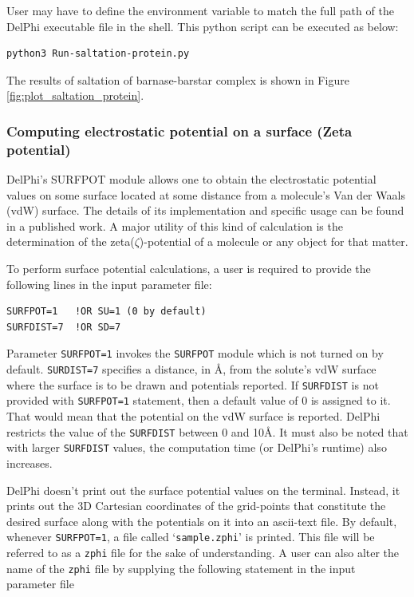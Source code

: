 \documentclass[9pt,tutorial,pubversion]{livecoms}
\newcommand*\ttvar[1]{\texttt{\expandafter\dottvar\detokenize{#1}\relax}}
\newcommand*\dottvar[1]{\ifx\relax#1\else
  \expandafter\ifx\string_#1\string_\allowbreak\else#1\fi
  \expandafter\dottvar\fi}
\begin{document}
User may have to define the environment variable \ttvar{$DELPHI_EXE} to match the full path of the DelPhi executable file in the shell. This python script can be executed as below:

\begin{verbatim}
python3 Run-saltation-protein.py
\end{verbatim}

The results of saltation of barnase-barstar complex is shown in Figure \ref{fig:plot_saltation_protein}.

\subsubsection{Computing electrostatic potential on a surface (Zeta potential)} 
DelPhi’s SURFPOT module allows one to obtain the electrostatic potential values on some surface located at some distance from a molecule’s Van der Waals (vdW) surface. The details of its implementation and specific usage can be found in a published work\cite{chakravorty2017new}. A major utility of this kind of calculation is the determination of the zeta($\zeta$)-potential of a molecule or any object for that matter. 

To perform surface potential calculations, a user is required to provide the following lines in the input parameter file:

\begin{verbatim}
SURFPOT=1   !OR SU=1 (0 by default)
SURFDIST=7  !OR SD=7
\end{verbatim}

Parameter \texttt{SURFPOT=1} invokes the \texttt{SURFPOT} module which is not turned on by default. \texttt{SURDIST=7} specifies a distance, in Å, from the solute’s vdW surface where the surface is to be drawn and potentials reported. If \texttt{SURFDIST} is not provided with \texttt{SURFPOT=1} statement, then a default value of 0 is assigned to it. That would mean that the potential on the vdW surface is reported. DelPhi restricts the value of the \texttt{SURFDIST} between 0 and 10Å. It must also be noted that with larger \texttt{SURFDIST} values, the computation time (or DelPhi’s runtime) also increases. 

DelPhi doesn’t print out the surface potential values on the terminal. Instead, it prints out the 3D Cartesian coordinates of the grid-points that constitute the desired surface along with the potentials on it into an ascii-text file. By default, whenever \texttt{SURFPOT=1}, a file called ‘\texttt{sample.zphi}’ is printed. This file will be referred to as a \texttt{zphi} file for the sake of understanding. A user can also alter the name of the \texttt{zphi} file by supplying the following statement in the input parameter file
\end{document}
